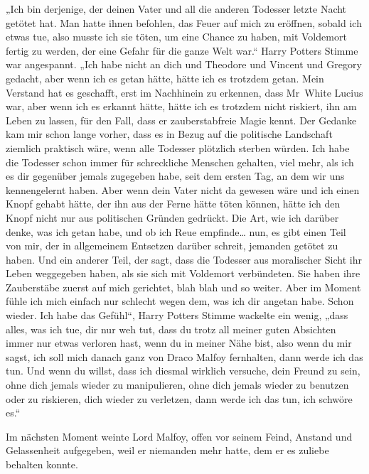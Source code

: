 „Ich bin derjenige, der deinen Vater und all die anderen Todesser letzte Nacht getötet hat. Man hatte ihnen befohlen, das Feuer auf mich zu eröffnen, sobald ich etwas tue, also musste ich sie töten, um eine Chance zu haben, mit Voldemort fertig zu werden, der eine Gefahr für die ganze Welt war.“ Harry Potters Stimme war angespannt. „Ich habe nicht an dich und Theodore und Vincent und Gregory gedacht, aber wenn ich es getan hätte, hätte ich es trotzdem getan. Mein Verstand hat es geschafft, erst im Nachhinein zu erkennen, dass Mr~White Lucius war, aber wenn ich es erkannt hätte, hätte ich es trotzdem nicht riskiert, ihn am Leben zu lassen, für den Fall, dass er zauberstabfreie Magie kennt. Der Gedanke kam mir schon lange vorher, dass es in Bezug auf die politische Landschaft ziemlich praktisch wäre, wenn alle Todesser plötzlich sterben würden. Ich habe die Todesser schon immer für schreckliche Menschen gehalten, viel mehr, als ich es dir gegenüber jemals zugegeben habe, seit dem ersten Tag, an dem wir uns kennengelernt haben. Aber wenn dein Vater nicht da gewesen wäre und ich einen Knopf gehabt hätte, der ihn aus der Ferne hätte töten können, hätte ich den Knopf nicht nur aus politischen Gründen gedrückt. Die Art, wie ich darüber denke, was ich getan habe, und ob ich Reue empfinde… nun, es gibt einen Teil von mir, der in allgemeinem Entsetzen darüber schreit, jemanden getötet zu haben. Und ein anderer Teil, der sagt, dass die Todesser aus moralischer Sicht ihr Leben weggegeben haben, als sie sich mit Voldemort verbündeten. Sie haben ihre Zauberstäbe zuerst auf mich gerichtet, blah blah und so weiter. Aber im Moment fühle ich mich einfach nur schlecht wegen dem, was ich dir angetan habe. Schon wieder. Ich habe das Gefühl“, Harry Potters Stimme wackelte ein wenig, „dass alles, was ich tue, dir nur weh tut, dass du trotz all meiner guten Absichten immer nur etwas verloren hast, wenn du in meiner Nähe bist, also wenn du mir sagst, ich soll mich danach ganz von Draco Malfoy fernhalten, dann werde ich das tun. Und wenn du willst, dass ich diesmal wirklich versuche, dein Freund zu sein, ohne dich jemals wieder zu manipulieren, ohne dich jemals wieder zu benutzen oder zu riskieren, dich wieder zu verletzen, dann werde ich das tun, ich schwöre es.“

Im nächsten Moment weinte Lord Malfoy, offen vor seinem Feind, Anstand und Gelassenheit aufgegeben, weil er niemanden mehr hatte, dem er es zuliebe behalten konnte.

